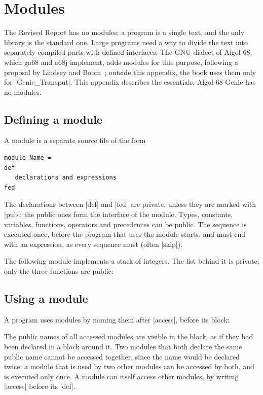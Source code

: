 \chapter{Modules}\label{app-modules}

The Revised Report has no modules: a program is a single text, and the
only library is the standard one. Large programs need a way to divide
the text into separately compiled parts with defined interfaces. The
GNU dialect of Algol 68, which ga68 and a68j implement, adds modules for
this purpose, following a proposal by Lindsey and Boom~\cite{modules};
outside this appendix, the book uses them only for \code|Genie_Transput|. This
appendix describes the essentials. Algol 68 Genie has no modules.

\section*{Defining a module}

A module is a separate source file of the form
\begin{lstlisting}
module Name =
def
   declarations and expressions
fed
\end{lstlisting}
The declarations between \code|def| and \code|fed| are private, unless
they are marked with \code|pub|; the public ones form the interface of
the module. Types, constants, variables, functions, operators and
precedences can be public. The sequence is executed once, before the
program that uses the module starts, and must end with an expression, as
every sequence must (often \code|skip|).

The following module implements a stack of integers. The list behind it
is private; only the three functions are public:


\section*{Using a module}

A program uses modules by naming them after \code|access|, before its
block:


The public names of all accessed modules are visible in the block, as if
they had been declared in a block around it. Two modules that both
declare the same public name cannot be accessed together, since the name
would be declared twice; a module that is used by two other modules can
be accessed by both, and is executed only once. A module can itself
access other modules, by writing \code|access| before its \code|def|.

